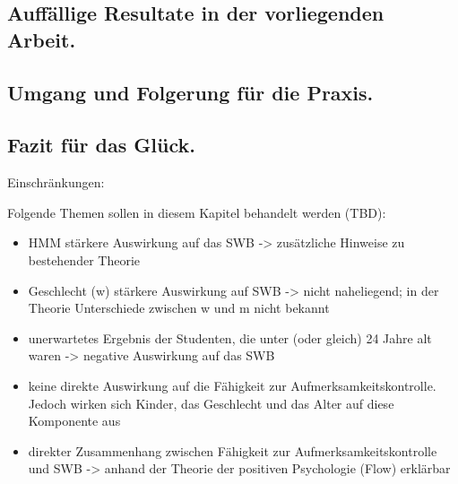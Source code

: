 \subsection{Auffällige Resultate in der vorliegenden Arbeit.}

\subsection{Umgang und Folgerung für die Praxis.}
\par
\subsection{Fazit für das Glück.}

Einschränkungen: 

Folgende Themen sollen in diesem Kapitel behandelt werden (TBD):
\begin{itemize}
    \item HMM stärkere Auswirkung auf das SWB -> zusätzliche Hinweise zu bestehender Theorie
    \item Geschlecht (w) stärkere Auswirkung auf SWB -> nicht naheliegend; in der Theorie Unterschiede zwischen w und m nicht bekannt
    \item unerwartetes Ergebnis der Studenten, die unter (oder gleich) 24 Jahre alt waren -> negative Auswirkung auf das SWB
    \item keine direkte Auswirkung auf die Fähigkeit zur Aufmerksamkeitskontrolle. Jedoch wirken sich Kinder, das Geschlecht und das Alter auf diese Komponente aus
    \item direkter Zusammenhang zwischen Fähigkeit zur Aufmerksamkeitskontrolle und SWB -> anhand der Theorie der positiven Psychologie (Flow) erklärbar
\end{itemize}

